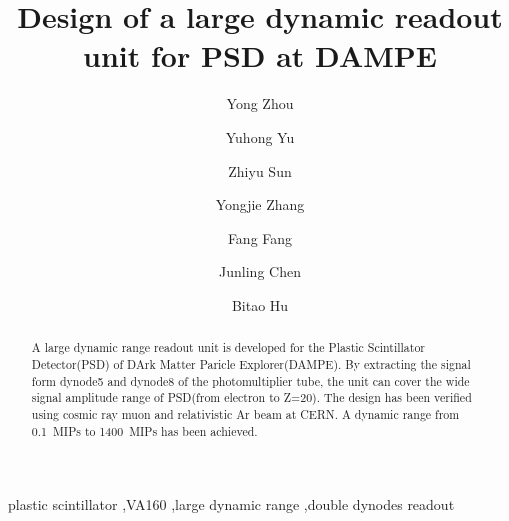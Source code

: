 \documentclass[5p, times]{elsarticle}
\begin{document}
\begin{frontmatter}

\title{Design of a large dynamic readout unit for PSD at DAMPE}

\author[imp,lzu,ucas]{Yong Zhou}

\author[imp]{Yuhong Yu}

\author[imp]{Zhiyu Sun}
\author[imp]{Yongjie Zhang}
\author[imp]{Fang Fang}
\author[imp]{Junling Chen}

\author[lzu]{Bitao Hu}

\address[imp]{Institute of Modern Physics, Chinese Academy of Sciences,  509 Nanchang Road,  Lanzhou,  730000,  P.R.China}
\address[lzu]{School of Nuclear Science and Technology,  Lanzhou University,  222 South Tianshui Road,  Lanzhou,  730000,  P.R.China}
\address[ucas]{Graduate University of the Chinese Academy of Sciences,  19A Yuquan Road,  Beijing,  100049,  P.R.China}

\begin{abstract}

A large dynamic range readout unit is developed for the Plastic Scintillator Detector(PSD) of DArk Matter Paricle Explorer(DAMPE).
By extracting the signal form dynode5 and dynode8 of the photomultiplier tube, the unit can cover the wide signal amplitude range of PSD(from electron to Z=20).
The design has been verified using cosmic ray muon and relativistic Ar beam at CERN.
A dynamic range from \SI{0.1}{MIPs} to \SI{1400}{MIPs} has been achieved.

\end{abstract}

\begin{keyword}
plastic scintillator
\sep VA160
\sep large dynamic range
\sep double dynodes readout


\end{keyword}

\end{frontmatter}
\end{document}
